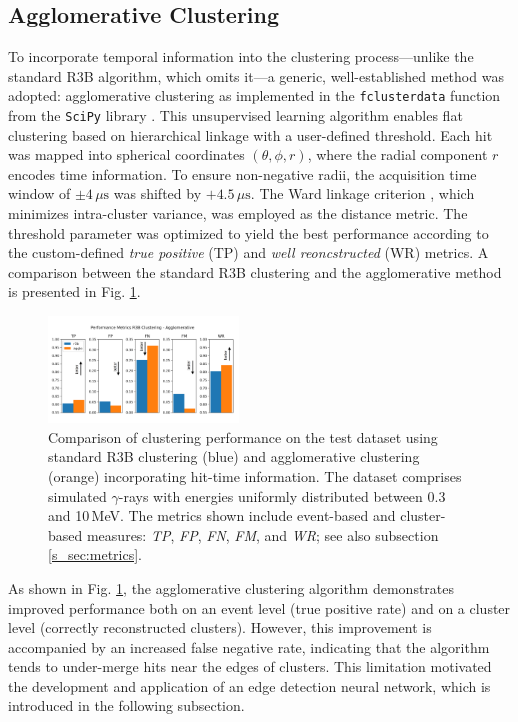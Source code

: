 \documentclass[final,5p,times,twocolumn]{elsarticle}
\begin{document}
\subsection{Agglomerative Clustering}\label{s_sec:agglo}
To incorporate temporal information into the clustering process---unlike the standard R3B algorithm, which omits it---a generic, well-established method was adopted: agglomerative clustering \cite{Nielsen2016} as implemented in the \texttt{fclusterdata} function from the \texttt{SciPy} library \cite{virtanen2020scipy}. This unsupervised learning algorithm enables flat clustering based on hierarchical linkage with a user-defined threshold.\newline
Each hit was mapped into spherical coordinates \((\theta, \phi, r)\), where the radial component \(r\) encodes time information. To ensure non-negative radii, the acquisition time window of \(\pm 4\,\mu\mathrm{s}\) was shifted by \(+4.5\,\mu\mathrm{s}\). The Ward linkage criterion \cite{nielsen2016hierarchical}, which minimizes intra-cluster variance, was employed as the distance metric.\newline
The threshold parameter was optimized to yield the best performance according to the custom-defined \textit{true positive} (TP) and \textit{well reoncstructed} (WR) metrics. A comparison between the standard R3B clustering and the agglomerative method is presented in Fig. \ref{fig:r3b_agglo_metrics}.
\begin{figure}[!htb]
	\centering 
	\includegraphics[width=0.45\textwidth]{r3b_agglo_arrows.png}	
	\caption{Comparison of clustering performance on the test dataset using standard R3B clustering (blue) and agglomerative clustering (orange) incorporating hit-time information. The dataset comprises simulated $\gamma$-rays with energies uniformly distributed between 0.3 and 10\,MeV. The metrics shown include event-based and cluster-based measures: \textit{TP}, \textit{FP}, \textit{FN}, \textit{FM}, and \textit{WR}; see also subsection \ref{s_sec:metrics}.} 
	\label{fig:r3b_agglo_metrics}%
\end{figure}
As shown in Fig. \ref{fig:r3b_agglo_metrics}, the agglomerative clustering algorithm demonstrates improved performance both on an event level (true positive rate) and on a cluster level (correctly reconstructed clusters). However, this improvement is accompanied by an increased false negative rate, indicating that the algorithm tends to under-merge hits near the edges of clusters. This limitation motivated the development and application of an edge detection neural network, which is introduced in the following subsection.
\end{document}
